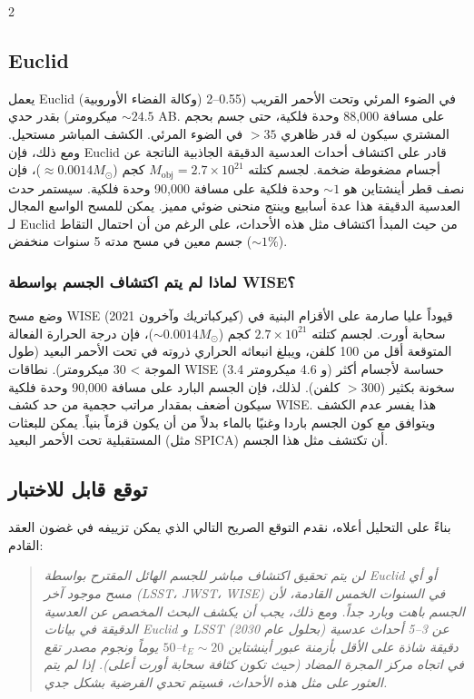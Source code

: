 \documentclass[11pt,a4paper]{article}
\begin{document}
\begin{multicols}{2}
		\subsection{Euclid}
		يعمل Euclid (وكالة الفضاء الأوروبية) في الضوء المرئي وتحت الأحمر القريب (0.55–2 ميكرومتر) بقدر حدي \(\sim 24.5\) AB. على مسافة 88,000 وحدة فلكية، حتى جسم بحجم المشتري سيكون له قدر ظاهري \(>35\) في الضوء المرئي. الكشف المباشر مستحيل. ومع ذلك، فإن Euclid قادر على اكتشاف أحداث العدسية الدقيقة الجاذبية الناتجة عن أجسام مضغوطة ضخمة. لجسم كتلته \(M_{\text{obj}} = 2.7\times10^{21}\) كجم (\(\approx 0.0014 M_{\odot}\))، فإن نصف قطر أينشتاين هو \(\sim 1\) وحدة فلكية على مسافة 90,000 وحدة فلكية. سيستمر حدث العدسية الدقيقة هذا عدة أسابيع وينتج منحنى ضوئي مميز. يمكن للمسح الواسع المجال لـ Euclid من حيث المبدأ اكتشاف مثل هذه الأحداث، على الرغم من أن احتمال التقاط جسم معين في مسح مدته 5 سنوات منخفض (\(\sim 1\%\)).
		
		\subsubsection{لماذا لم يتم اكتشاف الجسم بواسطة WISE؟}
		وضع مسح WISE (كيركباتريك وآخرون 2021) قيوداً عليا صارمة على الأقزام البنية في سحابة أورت. لجسم كتلته \(2.7\times10^{21}\) كجم (\(\sim 0.0014 M_{\odot}\))، فإن درجة الحرارة الفعالة المتوقعة أقل من 100 كلفن، ويبلغ انبعاثه الحراري ذروته في تحت الأحمر البعيد (طول الموجة > 30 ميكرومتر). نطاقات WISE (3.4 و 4.6 ميكرومتر) حساسة لأجسام أكثر سخونة بكثير (\(>300\) كلفن). لذلك، فإن الجسم البارد على مسافة 90,000 وحدة فلكية سيكون أضعف بمقدار مراتب حجمية من حد كشف WISE. هذا يفسر عدم الكشف ويتوافق مع كون الجسم باردا وغنيًا بالماء بدلاً من أن يكون قزماً بنياً. يمكن للبعثات المستقبلية تحت الأحمر البعيد (مثل SPICA) أن تكتشف مثل هذا الجسم.
		
		\subsection{توقع قابل للاختبار}
		بناءً على التحليل أعلاه، نقدم التوقع الصريح التالي الذي يمكن تزييفه في غضون العقد القادم:
		\begin{quote}
			\itshape
			لن يتم تحقيق اكتشاف مباشر للجسم الهائل المقترح بواسطة Euclid أو أي مسح موجود آخر (LSST، JWST، WISE) في السنوات الخمس القادمة، لأن الجسم باهت وبارد جداً. ومع ذلك، يجب أن يكشف البحث المخصص عن العدسية الدقيقة في بيانات Euclid و LSST (بحلول عام 2030) عن 3–5 أحداث عدسية دقيقة شاذة على الأقل بأزمنة عبور أينشتاين \(t_E \sim 20\)–\(50\) يوماً ونجوم مصدر تقع في اتجاه مركز المجرة المضاد (حيث تكون كثافة سحابة أورت أعلى). إذا لم يتم العثور على مثل هذه الأحداث، فسيتم تحدي الفرضية بشكل جدي.
		\end{quote}
		
	\end{multicols}
	
\end{document}
